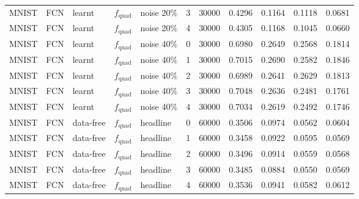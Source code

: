 {\begin{longtable}[]{@{}lllllr r r r r r@{}}
MNIST & FCN & learnt & $f_{\text{quad}}$ & noise 20\% & 3 & 30000 & 0.4296 & 0.1164 & 0.1118 & 0.0681 \\
MNIST & FCN & learnt & $f_{\text{quad}}$ & noise 20\% & 4 & 30000 & 0.4305 & 0.1168 & 0.1045 & 0.0660 \\
\addlinespace[2pt]
MNIST & FCN & learnt & $f_{\text{quad}}$ & noise 40\% & 0 & 30000 & 0.6980 & 0.2649 & 0.2568 & 0.1814 \\
MNIST & FCN & learnt & $f_{\text{quad}}$ & noise 40\% & 1 & 30000 & 0.7015 & 0.2690 & 0.2582 & 0.1846 \\
MNIST & FCN & learnt & $f_{\text{quad}}$ & noise 40\% & 2 & 30000 & 0.6989 & 0.2641 & 0.2629 & 0.1813 \\
MNIST & FCN & learnt & $f_{\text{quad}}$ & noise 40\% & 3 & 30000 & 0.7048 & 0.2636 & 0.2481 & 0.1761 \\
MNIST & FCN & learnt & $f_{\text{quad}}$ & noise 40\% & 4 & 30000 & 0.7034 & 0.2619 & 0.2492 & 0.1746 \\
\addlinespace[2pt]
MNIST & FCN & data-free & $f_{\text{quad}}$ & headline & 0 & 60000 & 0.3506 & 0.0974 & 0.0562 & 0.0604 \\
MNIST & FCN & data-free & $f_{\text{quad}}$ & headline & 1 & 60000 & 0.3458 & 0.0922 & 0.0595 & 0.0569 \\
MNIST & FCN & data-free & $f_{\text{quad}}$ & headline & 2 & 60000 & 0.3496 & 0.0914 & 0.0559 & 0.0568 \\
MNIST & FCN & data-free & $f_{\text{quad}}$ & headline & 3 & 60000 & 0.3485 & 0.0884 & 0.0550 & 0.0569 \\
MNIST & FCN & data-free & $f_{\text{quad}}$ & headline & 4 & 60000 & 0.3536 & 0.0941 & 0.0582 & 0.0612 \\
\end{longtable}}
